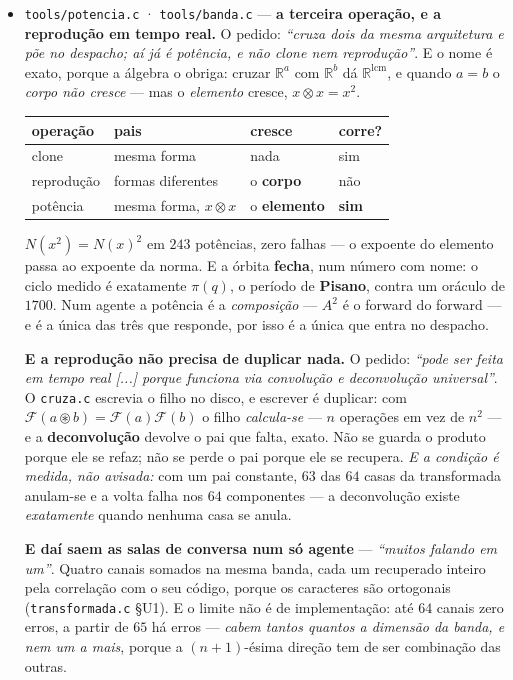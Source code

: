 \documentclass[11pt]{article}
\newcommand{\code}[1]{\texttt{\small #1}}
\newcommand{\R}{\mathbb R}
\theoremstyle{plain}
\theoremstyle{remark}
\begin{document}
\begin{itemize}
\item \code{tools/potencia.c} · \code{tools/banda.c} --- \textbf{a terceira operação, e a
reprodução em tempo real.} O pedido: \emph{``cruza dois da mesma arquitetura e põe no despacho; aí já
é potência, e não clone nem reprodução''}. E o nome é exato, porque a álgebra o obriga: cruzar
$\R^a$ com $\R^b$ dá $\R^{\mathrm{lcm}}$, e quando $a=b$ o \emph{corpo não cresce} --- mas o
\emph{elemento} cresce, $x \otimes x = x^2$.

\begin{center}\small
\begin{tabular}{llll}
operação & pais & cresce & corre? \\ \hline
clone & mesma forma & nada & sim \\
reprodução & formas diferentes & o \textbf{corpo} & não \\
potência & mesma forma, $x\otimes x$ & o \textbf{elemento} & \textbf{sim} \\
\end{tabular}
\end{center}

$N(x^2)=N(x)^2$ em $243$ potências, zero falhas --- o expoente do elemento passa ao expoente da
norma. E a órbita \textbf{fecha}, num número com nome: o ciclo medido é exatamente $\pi(q)$, o
período de \textbf{Pisano}, contra um oráculo de $1700$. Num agente a potência é a
\emph{composição} --- $A^2$ é o forward do forward --- e é a única das três que responde, por isso
é a única que entra no despacho.

\textbf{E a reprodução não precisa de duplicar nada.} O pedido: \emph{``pode ser feita em tempo real
[...] porque funciona via convolução e deconvolução universal''}. O \code{cruza.c} escrevia o filho
no disco, e escrever é duplicar: com $\mathcal F(a\circledast b)=\mathcal F(a)\mathcal F(b)$ o filho
\emph{calcula-se} --- $n$ operações em vez de $n^2$ --- e a \textbf{deconvolução} devolve o pai que
falta, exato. Não se guarda o produto porque ele se refaz; não se perde o pai porque ele se
recupera. \emph{E a condição é medida, não avisada:} com um pai constante, $63$ das $64$ casas da
transformada anulam-se e a volta falha nos $64$ componentes --- a deconvolução existe
\emph{exatamente} quando nenhuma casa se anula.

\textbf{E daí saem as salas de conversa num só agente} --- \emph{``muitos falando em um''}. Quatro
canais somados na mesma banda, cada um recuperado inteiro pela correlação com o seu código, porque
os caracteres são ortogonais (\code{transformada.c} §U1). E o limite não é de implementação: até
$64$ canais zero erros, a partir de $65$ há erros --- \emph{cabem tantos quantos a dimensão da
banda, e nem um a mais}, porque a $(n{+}1)$-ésima direção tem de ser combinação das outras.


\end{itemize}
\end{document}
